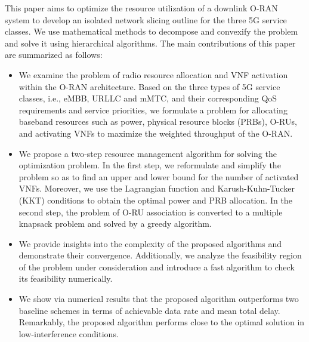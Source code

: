 \documentclass[12pt, letterpaper]{article}
\begin{document}
This paper aims to optimize the resource utilization of a downlink O-RAN system to develop an isolated network slicing outline for the three 5G service classes.
We use mathematical methods to decompose and convexify the problem and solve it using hierarchical algorithms.
 The main contributions of this paper are summarized as follows:
\begin{itemize}
\item We examine the problem of radio resource allocation and VNF activation within the O-RAN architecture.
Based on the three types of 5G service classes, i.e., eMBB, URLLC and mMTC, and their corresponding QoS requirements and service priorities, we formulate a problem for allocating baseband resources such as power, physical resource blocks (PRBs), O-RUs, and activating VNFs to maximize the weighted throughput of the O-RAN.
\item We propose a two-step resource management algorithm for solving the optimization problem.
In the first step, we reformulate and simplify the problem so as to find an upper and lower bound for the number of activated VNFs. Moreover, we use the Lagrangian function and Karush-Kuhn-Tucker (KKT) conditions to obtain the optimal power and PRB allocation. In the second step, the problem of O-RU association is converted to a multiple knapsack problem and solved by a greedy algorithm.
\item We provide insights into the complexity of the proposed algorithms and demonstrate their convergence. Additionally, we analyze the feasibility region of the problem under consideration and introduce a fast algorithm to check its feasibility numerically.
\item We show via numerical results that the proposed algorithm outperforms two baseline schemes in terms of achievable data rate and mean total delay. Remarkably, the proposed algorithm performs close to the optimal solution in low-interference conditions.
\end{itemize}
\end{document}

